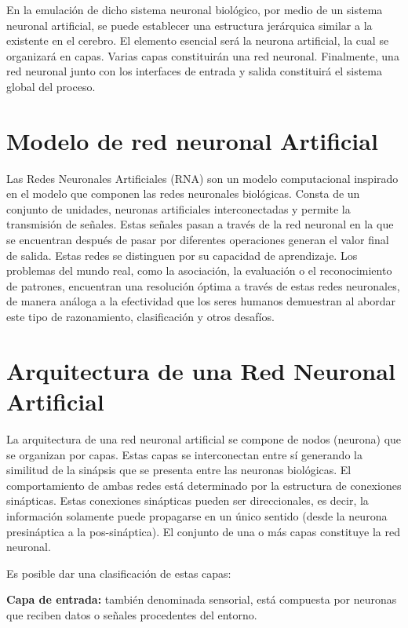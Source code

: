 \documentclass[
  us-letterpaper,
]{scrreprt}
\theoremstyle{plain}
\theoremstyle{definition}
\theoremstyle{definition}
\theoremstyle{remark}
\begin{document}
En la emulación de dicho sistema neuronal biológico, por medio de un
sistema neuronal artificial, se puede establecer una estructura
jerárquica similar a la existente en el cerebro. El elemento esencial
será la neurona artificial, la cual se organizará en capas. Varias capas
constituirán una red neuronal. Finalmente, una red neuronal junto con
los interfaces de entrada y salida constituirá el sistema global del
proceso.

\section{Modelo de red neuronal
Artificial}\label{modelo-de-red-neuronal-artificial}

Las Redes Neuronales Artificiales (RNA) son un modelo computacional
inspirado en el modelo que componen las redes neuronales biológicas.
Consta de un conjunto de unidades, neuronas artificiales interconectadas
y permite la transmisión de señales. Estas señales pasan a través de la
red neuronal en la que se encuentran después de pasar por diferentes
operaciones generan el valor final de salida. Estas redes se distinguen
por su capacidad de aprendizaje. Los problemas del mundo real, como la
asociación, la evaluación o el reconocimiento de patrones, encuentran
una resolución óptima a través de estas redes neuronales, de manera
análoga a la efectividad que los seres humanos demuestran al abordar
este tipo de razonamiento, clasificación y otros desafíos.

\section{Arquitectura de una Red Neuronal
Artificial}\label{arquitectura-de-una-red-neuronal-artificial}

La arquitectura de una red neuronal artificial se compone de nodos
(neurona) que se organizan por capas. Estas capas se interconectan entre
sí generando la similitud de la sinápsis que se presenta entre las
neuronas biológicas. El comportamiento de ambas redes está determinado
por la estructura de conexiones sinápticas. Estas conexiones sinápticas
pueden ser direccionales, es decir, la información solamente puede
propagarse en un único sentido (desde la neurona presináptica a la
pos-sináptica). El conjunto de una o más capas constituye la red
neuronal.

Es posible dar una clasificación de estas capas:

\textbf{Capa de entrada:} también denominada sensorial, está compuesta
por neuronas que reciben datos o señales procedentes del entorno.
\end{document}

